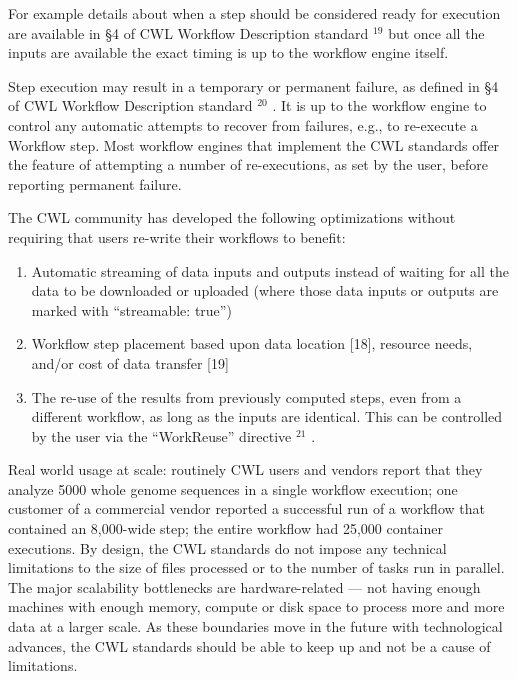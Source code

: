 \documentclass[
]{article}
\providecommand{\tightlist}{%
  \setlength{\itemsep}{0pt}\setlength{\parskip}{0pt}}
\begin{document}
For example details about when a step should be considered ready for
execution are available in §4 of CWL Workflow Description standard
\(^{19}\) but once all the inputs are available the exact timing is up
to the workflow engine itself.

Step execution may result in a temporary or permanent failure, as
defined in §4 of CWL Workflow Description standard \(^{20}\) . It is up
to the workflow engine to control any automatic attempts to recover from
failures, e.g., to re-execute a Workflow step. Most workflow engines
that implement the CWL standards offer the feature of attempting a
number of re-executions, as set by the user, before reporting permanent
failure.

The CWL community has developed the following optimizations without
requiring that users re-write their workflows to benefit:

\begin{enumerate}
\def\labelenumi{(\arabic{enumi})}
\tightlist
\item
  Automatic streaming of data inputs and outputs instead of waiting for
  all the data to be downloaded or uploaded (where those data inputs or
  outputs are marked with ``streamable: true'')\\
\item
  Workflow step placement based upon data location {[}18{]}, resource
  needs, and/or cost of data transfer {[}19{]}\\
\item
  The re-use of the results from previously computed steps, even from a
  different workflow, as long as the inputs are identical. This can be
  controlled by the user via the ``WorkReuse'' directive \(^{21}\) .
\end{enumerate}

Real world usage at scale: routinely CWL users and vendors report that
they analyze 5000 whole genome sequences in a single workflow execution;
one customer of a commercial vendor reported a successful run of a
workflow that contained an 8,000-wide step; the entire workflow had
25,000 container executions. By design, the CWL standards do not impose
any technical limitations to the size of files processed or to the
number of tasks run in parallel. The major scalability bottlenecks are
hardware-related --- not having enough machines with enough memory,
compute or disk space to process more and more data at a larger scale.
As these boundaries move in the future with technological advances, the
CWL standards should be able to keep up and not be a cause of
limitations.
\end{document}
